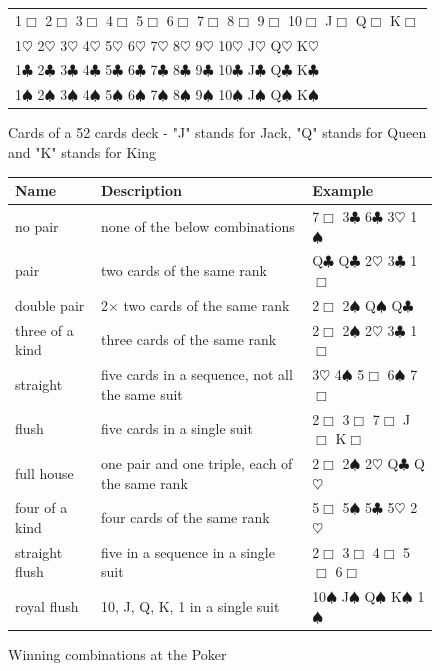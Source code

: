 \begin{figure}
\begin{center}
\begin{tabular}{|l|}
\hline
1$\Box$ 2$\Box$ 3$\Box$ 4$\Box$ 5$\Box$ 6$\Box$ 7$\Box$ 8$\Box$ 9$\Box$ 10$\Box$ J$\Box$ Q$\Box$ K$\Box$\\
1$\heartsuit$ 2$\heartsuit$ 3$\heartsuit$ 4$\heartsuit$ 5$\heartsuit$ 6$\heartsuit$ 7$\heartsuit$ 8$\heartsuit$ 9$\heartsuit$ 10$\heartsuit$ J$\heartsuit$ Q$\heartsuit$ K$\heartsuit$\\
1$\clubsuit$ 2$\clubsuit$ 3$\clubsuit$ 4$\clubsuit$ 5$\clubsuit$ 6$\clubsuit$ 7$\clubsuit$ 8$\clubsuit$ 9$\clubsuit$ 10$\clubsuit$ J$\clubsuit$ Q$\clubsuit$ K$\clubsuit$\\
1$\spadesuit$ 2$\spadesuit$ 3$\spadesuit$ 4$\spadesuit$ 5$\spadesuit$ 6$\spadesuit$ 7$\spadesuit$ 8$\spadesuit$ 9$\spadesuit$ 10$\spadesuit$ J$\spadesuit$ Q$\spadesuit$ K$\spadesuit$\\
\hline
\end{tabular}
\end{center}
\caption{Cards of a 52 cards deck - "J" stands for Jack, "Q" stands for Queen and "K" stands for King}
\label{fig-introstats-52cards}
\end{figure}

\begin{figure}
\begin{center}
\begin{tabular}{|lll|}
\hline
Name & Description & Example \\
\hline
no pair & none of the below combinations & 7$\Box$ 3$\clubsuit$ 6$\clubsuit$ 3$\heartsuit$ 1$\spadesuit$\\
pair & two cards of the same rank & Q$\clubsuit$ Q$\clubsuit$ 2$\heartsuit$ 3$\clubsuit$ 1$\Box$\\
double pair & 2$\times$ two cards of the same rank & 2$\Box$ 2$\spadesuit$ Q$\spadesuit$ Q$\clubsuit$\\
three of a kind & three cards of the same rank & 2$\Box$ 2$\spadesuit$ 2$\heartsuit$ 3$\clubsuit$ 1$\Box$\\
straight & five cards in a sequence, not all the same suit & 3$\heartsuit$ 4$\spadesuit$ 5$\Box$ 6$\spadesuit$ 7$\Box$\\
flush & five cards in a single suit & 2$\Box$ 3$\Box$ 7$\Box$ J$\Box$ K$\Box$\\
full house & one pair and one triple, each of the same rank & 2$\Box$ 2$\spadesuit$ 2$\heartsuit$ Q$\clubsuit$ Q$\heartsuit$\\
four of a kind & four cards of the same rank & 5$\Box$ 5$\spadesuit$ 5$\clubsuit$ 5$\heartsuit$ 2$\heartsuit$\\
straight flush & five in a sequence in a single suit& 2$\Box$ 3$\Box$ 4$\Box$ 5$\Box$ 6$\Box$\\
royal flush & 10, J, Q, K, 1 in a single suit & 10$\spadesuit$ J$\spadesuit$ Q$\spadesuit$ K$\spadesuit$ 1$\spadesuit$ \\
\hline
\end{tabular}
\end{center}
\caption{Winning combinations at the Poker}
\label{fig-introstats-winpoker}
\end{figure}

